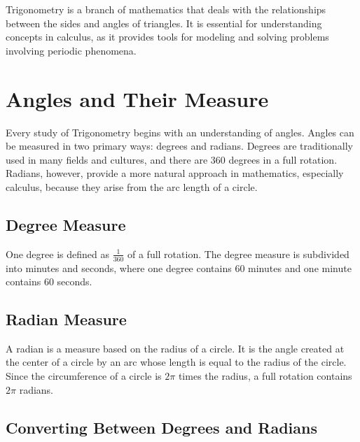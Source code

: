 \documentclass[a4paper,12pt]{book}
\newcounter{problem}
\begin{document}
Trigonometry is a branch of mathematics that deals with the relationships between the sides and angles of triangles. It is essential for understanding concepts in calculus, as it provides tools for modeling and solving problems involving periodic phenomena.


\section{Angles and Their Measure}
\label{sec:angles_measure}

Every study of Trigonometry begins with an understanding of angles. Angles can be measured in two primary ways: degrees and radians. Degrees are traditionally used in many fields and cultures, and there are \(360\) degrees in a full rotation. Radians, however, provide a more natural approach in mathematics, especially calculus, because they arise from the arc length of a circle.

\subsection{Degree Measure}
\label{subsec:degree_measure}

One degree is defined as \(\frac{1}{360}\) of a full rotation. The degree measure is subdivided into minutes and seconds, where one degree contains \(60\) minutes and one minute contains \(60\) seconds.

\subsection{Radian Measure}
\label{subsec:radian_measure}

A radian is a measure based on the radius of a circle. It is the angle created at the center of a circle by an arc whose length is equal to the radius of the circle. Since the circumference of a circle is \(2\pi\) times the radius, a full rotation contains \(2\pi\) radians.

\subsection{Converting Between Degrees and Radians}
\label{subsec:converting_degrees_radians}
\end{document}
